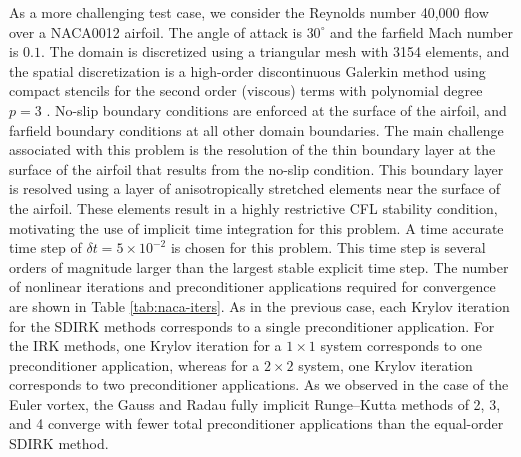 \documentclass[review]{siamart}
\begin{document}
As a more challenging test case, we consider the Reynolds number 40{,}000 flow
over a NACA0012 airfoil. The angle of attack is $30^\circ$ and the farfield Mach
number is $0.1$. The domain is discretized using a triangular mesh with 3154
elements, and the spatial discretization is a high-order discontinuous Galerkin
method using compact stencils for the second order (viscous) terms with
polynomial degree $p=3$ \cite{Peraire2008}. No-slip boundary conditions are
enforced at the surface of the airfoil, and farfield boundary conditions at all
other domain boundaries. The main challenge associated with this problem is the
resolution of the thin boundary layer at the surface of the airfoil that results
from the no-slip condition. This boundary layer is resolved using a layer of
anisotropically stretched elements near the surface of the airfoil. These
elements result in a highly restrictive CFL stability condition, motivating the
use of implicit time integration for this problem. A time accurate time step of
$\delta t = 5 \times 10^{-2}$ is chosen for this problem. This time step is
several orders of magnitude larger than the largest stable explicit time step.
The number of nonlinear iterations and preconditioner applications required for
convergence are shown in Table \ref{tab:naca-iters}. As in the previous case,
each Krylov iteration for the SDIRK methods corresponds to a single
preconditioner application. For the IRK methods, one Krylov iteration for a
$1\times1$ system corresponds to one preconditioner application, whereas for a
$2\times2$ system, one Krylov iteration corresponds to two preconditioner
applications. As we observed in the case of the Euler vortex, the Gauss and
Radau fully implicit Runge--Kutta methods of 2, 3, and 4 converge with fewer
total preconditioner applications than the equal-order SDIRK method.
\end{document}
